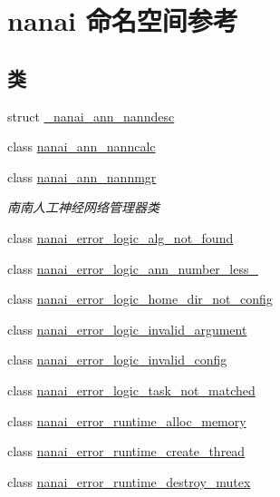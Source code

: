 \hypertarget{namespacenanai}{}\section{nanai 命名空间参考}
\label{namespacenanai}
\subsection*{类}
\begin{DoxyCompactItemize}
\item 
struct \hyperlink{structnanai_1_1__nanai__ann__nanndesc}{\+\_\+nanai\+\_\+ann\+\_\+nanndesc}
\item 
class \hyperlink{classnanai_1_1nanai__ann__nanncalc}{nanai\+\_\+ann\+\_\+nanncalc}
\item 
class \hyperlink{classnanai_1_1nanai__ann__nannmgr}{nanai\+\_\+ann\+\_\+nannmgr}
\begin{DoxyCompactList}\small\item\em 南南人工神经网络管理器类 \end{DoxyCompactList}\item 
class \hyperlink{classnanai_1_1nanai__error__logic__alg__not__found}{nanai\+\_\+error\+\_\+logic\+\_\+alg\+\_\+not\+\_\+found}
\item 
class \hyperlink{classnanai_1_1nanai__error__logic__ann__number__less__2}{nanai\+\_\+error\+\_\+logic\+\_\+ann\+\_\+number\+\_\+less\+\_}
\item 
class \hyperlink{classnanai_1_1nanai__error__logic__home__dir__not__config}{nanai\+\_\+error\+\_\+logic\+\_\+home\+\_\+dir\+\_\+not\+\_\+config}
\item 
class \hyperlink{classnanai_1_1nanai__error__logic__invalid__argument}{nanai\+\_\+error\+\_\+logic\+\_\+invalid\+\_\+argument}
\item 
class \hyperlink{classnanai_1_1nanai__error__logic__invalid__config}{nanai\+\_\+error\+\_\+logic\+\_\+invalid\+\_\+config}
\item 
class \hyperlink{classnanai_1_1nanai__error__logic__task__not__matched}{nanai\+\_\+error\+\_\+logic\+\_\+task\+\_\+not\+\_\+matched}
\item 
class \hyperlink{classnanai_1_1nanai__error__runtime__alloc__memory}{nanai\+\_\+error\+\_\+runtime\+\_\+alloc\+\_\+memory}
\item 
class \hyperlink{classnanai_1_1nanai__error__runtime__create__thread}{nanai\+\_\+error\+\_\+runtime\+\_\+create\+\_\+thread}
\item 
class \hyperlink{classnanai_1_1nanai__error__runtime__destroy__mutex}{nanai\+\_\+error\+\_\+runtime\+\_\+destroy\+\_\+mutex}

\end{DoxyCompactItemize}
